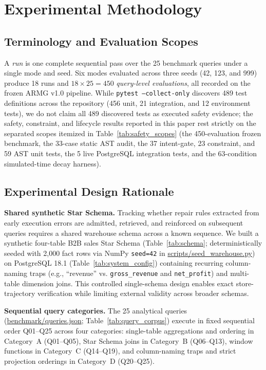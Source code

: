 \section{Experimental Methodology}
\subsection{Terminology and Evaluation Scopes}
A \emph{run} is one complete sequential pass over the 25 benchmark queries under a single mode and seed. Six modes evaluated across three seeds (42, 123, and 999) produce 18 runs and $18 \times 25 = 450$ \emph{query-level evaluations}, all recorded on the frozen ARMG v1.0 pipeline. While \texttt{pytest --collect-only} discovers 489 test definitions across the repository (456 unit, 21 integration, and 12 environment tests), we do not claim all 489 discovered tests as executed safety evidence; the safety, constraint, and lifecycle results reported in this paper rest strictly on the separated scopes itemized in Table~\ref{tab:safety_scopes} (the 450-evaluation frozen benchmark, the 33-case static AST audit, the 37 intent-gate, 23 constraint, and 59 AST unit tests, the 5 live PostgreSQL integration tests, and the 63-condition simulated-time decay harness).

\subsection{Experimental Design Rationale}
\textbf{Shared synthetic Star Schema.} Tracking whether repair rules extracted from early execution errors are admitted, retrieved, and reinforced on subsequent queries requires a shared warehouse schema across a known sequence. We built a synthetic four-table B2B sales Star Schema (Table~\ref{tab:schema}; deterministically seeded with 2,000 fact rows via NumPy \texttt{seed=42} in \url{scripts/seed_warehouse.py}) on PostgreSQL 18.1 (Table~\ref{tab:system_config}) containing recurring column-naming traps (e.g., ``revenue'' vs. \texttt{gross\_revenue} and \texttt{net\_profit}) and multi-table dimension joins. This controlled single-schema design enables exact store-trajectory verification while limiting external validity across broader schemas.

\textbf{Sequential query categories.} The 25 analytical queries (\url{benchmark/queries.json}; Table~\ref{tab:query_corpus}) execute in fixed sequential order Q01--Q25 across four categories: single-table aggregations and ordering in Category~A (Q01--Q05), Star Schema joins in Category~B (Q06--Q13), window functions in Category~C (Q14--Q19), and column-naming traps and strict projection orderings in Category~D (Q20--Q25).

